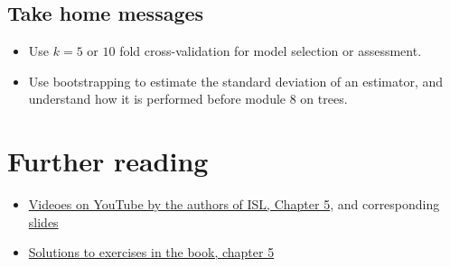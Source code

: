 \documentclass[]{article}
\providecommand{\tightlist}{%
  \setlength{\itemsep}{0pt}\setlength{\parskip}{0pt}}
\begin{document}
\hypertarget{take-home-messages}{%
\subsection{Take home messages}\label{take-home-messages}}

\begin{itemize}
\tightlist
\item
  Use \(k=5\) or \(10\) fold cross-validation for model selection or
  assessment.
\item
  Use bootstrapping to estimate the standard deviation of an estimator,
  and understand how it is performed before module 8 on trees.
\end{itemize}

\hypertarget{further-reading}{%
\section{Further reading}\label{further-reading}}

\begin{itemize}
\tightlist
\item
  \href{https://www.youtube.com/playlist?list=PL5-da3qGB5IA6E6ZNXu7dp89_uv8yocmf}{Videoes
  on YouTube by the authors of ISL, Chapter 5}, and corresponding
  \href{https://lagunita.stanford.edu/c4x/HumanitiesScience/StatLearning/asset/cv_boot.pdf}{slides}
\item
  \href{https://rstudio-pubs-static.s3.amazonaws.com/65561_43c0eaaa8565414eae333b47038f716c.html}{Solutions
  to exercises in the book, chapter 5}
\end{itemize}
\end{document}
